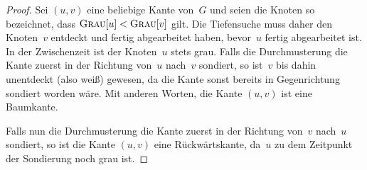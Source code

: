 \begin{proof}
Sei $(u,v)$ eine beliebige Kante von~$G$ und seien die Knoten so bezeichnet, dass $\mathop{\text{\textsc{Grau}}}[u] < \mathop{\text{\textsc{Grau}}}[v]$ gilt.
Die Tiefensuche muss daher den Knoten~$v$ entdeckt und fertig abgearbeitet haben, bevor~$u$ fertig abgearbeitet ist.
In der Zwischenzeit ist der Knoten~$u$ stets grau.
Falls die Durchmusterung die Kante zuerst in der Richtung von~$u$ nach~$v$ sondiert, so ist~$v$ bis dahin unentdeckt (also weiß) gewesen, da die Kante sonst bereits in Gegenrichtung sondiert worden wäre.
Mit anderen Worten, die Kante $(u,v)$ ist eine Baumkante.

Falls nun die Durchmusterung die Kante zuerst in der Richtung von~$v$ nach~$u$ sondiert, so ist die Kante $(u,v)$ eine Rückwärtskante, da~$u$ zu dem Zeitpunkt der Sondierung noch grau ist.
\end{proof}


